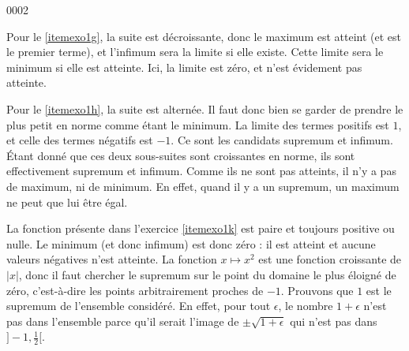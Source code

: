 
\begin{corrige}{0002}

Pour le \ref{itemexo1g}, la suite est décroissante, donc le maximum est atteint (et est le premier terme), et l'infimum sera la limite si elle existe. Cette limite sera le minimum si elle est atteinte. Ici, la limite est zéro, et n'est évidement pas atteinte.

Pour le \ref{itemexo1h}, la suite est alternée. Il faut donc bien se garder de prendre le plus petit en norme comme étant le minimum. La limite des termes positifs est $1$, et celle des termes négatifs est $-1$. Ce sont les candidats supremum et infimum. Étant donné que ces deux sous-suites sont croissantes en norme, ils sont effectivement supremum et infimum. Comme ils ne sont pas atteints, il n'y a pas de maximum, ni de minimum. En effet, quand il y a un supremum, un maximum ne peut que lui être égal.

La fonction présente dans l'exercice \ref{itemexo1k} est paire et toujours positive ou nulle. Le minimum (et donc infimum) est donc zéro : il est atteint et aucune valeurs négatives n'est atteinte. La fonction $x\mapsto x^2$ est une fonction croissante de $| x |$, donc il faut chercher le supremum sur le point du domaine le plus éloigné de zéro, c'est-à-dire les points arbitrairement proches de $-1$. Prouvons que $1$ est le supremum de l'ensemble considéré. En effet, pour tout $\epsilon$, le nombre $1+\epsilon$ n'est pas dans l'ensemble parce qu'il serait l'image de $\pm\sqrt{1+\epsilon}$ qui n'est pas dans $]-1,\frac{1}{ 2 }[$.

\end{corrige}

